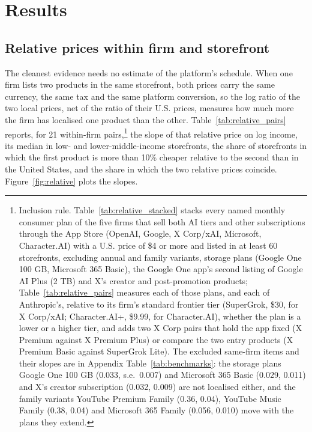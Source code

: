 \documentclass[11pt]{article}
\theoremstyle{definition}
\theoremstyle{remark}
\begin{document}
\section{Results}\label{sec:results}

\subsection{Relative prices within firm and storefront}\label{sec:relative}

The cleanest evidence needs no estimate of the platform's schedule. When one firm lists two products in the same storefront, both prices carry the same currency, the same tax and the same platform conversion, so the log ratio of the two local prices, net of the ratio of their U.S. prices, measures how much more the firm has localised one product than the other. Table~\ref{tab:relative_pairs} reports, for 21 within-firm pairs,\footnote{Inclusion rule. Table~\ref{tab:relative_stacked} stacks every named monthly consumer plan of the five firms that sell both AI tiers and other subscriptions through the App Store (OpenAI, Google, X Corp/xAI, Microsoft, Character.AI) with a U.S. price of \$4 or more and listed in at least 60 storefronts, excluding annual and family variants, storage plans (Google One 100 GB, Microsoft 365 Basic), the Google One app's second listing of Google AI Plus (2 TB) and X's creator and post-promotion products; Table~\ref{tab:relative_pairs} measures each of those plans, and each of Anthropic's, relative to its firm's standard frontier tier (SuperGrok, \$30, for X Corp/xAI; Character.AI+, \$9.99, for Character.AI), whether the plan is a lower or a higher tier, and adds two X Corp pairs that hold the app fixed (X Premium against X Premium Plus) or compare the two entry products (X Premium Basic against SuperGrok Lite). The excluded same-firm items and their slopes are in Appendix Table~\ref{tab:benchmarks}: the storage plans Google One 100 GB (0.033, s.e.\ 0.007) and Microsoft 365 Basic (0.029, 0.011) and X's creator subscription (0.032, 0.009) are not localised either, and the family variants YouTube Premium Family (0.36, 0.04), YouTube Music Family (0.38, 0.04) and Microsoft 365 Family (0.056, 0.010) move with the plans they extend.} the slope of that relative price on log income, its median in low- and lower-middle-income storefronts, the share of storefronts in which the first product is more than 10\% cheaper relative to the second than in the United States, and the share in which the two relative prices coincide. Figure~\ref{fig:relative} plots the slopes.
\end{document}

